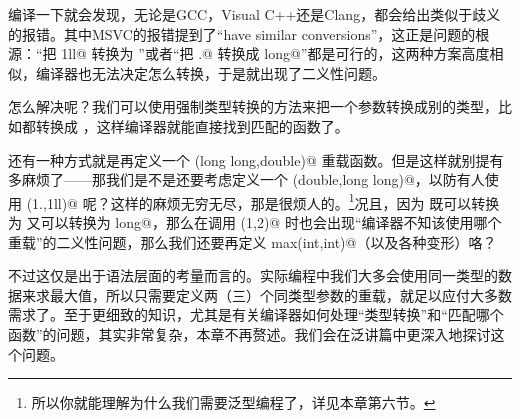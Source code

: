 编译一下就会发现，无论是GCC，Visual C++还是Clang，都会给出类似于歧义的报错。其中MSVC的报错提到了``have similar conversions''，这正是问题的根源：``把 \lstinline@1ll@ 转换为 \lstinline@double@''或者``把 .@ 转换成 \lstinline@long long@''都是可行的，这两种方案高度相似，编译器也无法决定怎么转换，于是就出现了二义性问题。\par
怎么解决呢？我们可以使用强制类型转换的方法来把一个参数转换成别的类型，比如都转换成 \lstinline@double@，这样编译器就能直接找到匹配的函数了。\par
还有一种方式就是再定义一个 \lstinline@fun(long long,double)@ 重载函数。但是这样就别提有多麻烦了——那我们是不是还要考虑定义一个 \lstinline@fun(double,long long)@，以防有人使用 \lstinline@fun(1.,1ll)@ 呢？这样的麻烦无穷无尽，那是很烦人的。\footnote{所以你就能理解为什么我们需要泛型编程了，详见本章第六节。}况且，因为 \lstinline@int@ 既可以转换为 \lstinline@double@ 又可以转换为 \lstinline@long long@，那么在调用 \lstinline@max(1,2)@ 时也会出现``编译器不知该使用哪个重载''的二义性问题，那么我们还要再定义 \lstinline@int max(int,int)@（以及各种变形）咯？\par
不过这仅是出于语法层面的考量而言的。实际编程中我们大多会使用同一类型的数据来求最大值，所以只需要定义两（三）个同类型参数的重载，就足以应付大多数需求了。至于更细致的知识，尤其是有关编译器如何处理``类型转换''和``匹配哪个函数''的问题，其实非常复杂，本章不再赘述。我们会在泛讲篇中更深入地探讨这个问题。\par
